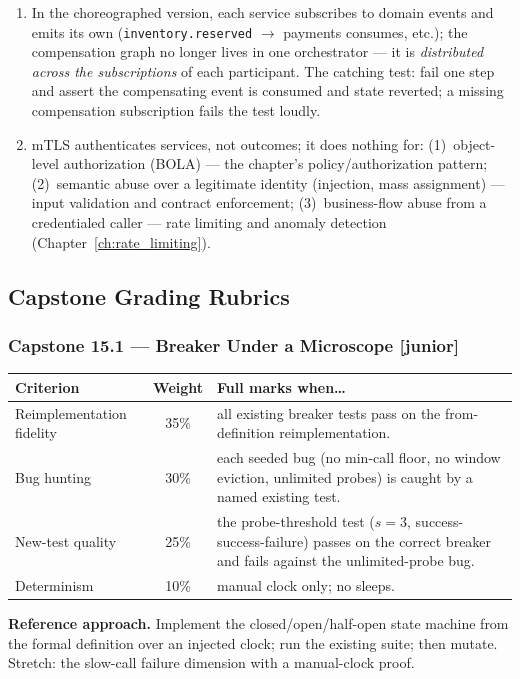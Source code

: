\begin{enumerate}[leftmargin=2.2em]
    tracks the last applied seq per aggregate and buffers/refetches on a
    gap. Crash-mid-batch replays then cannot interleave with new events ---
    the consumer enforces monotonic application per aggregate regardless of
    publisher timing.
  \item In the choreographed version, each service subscribes to domain
    events and emits its own (\texttt{inventory.reserved} $\to$ payments
    consumes, etc.); the compensation graph no longer lives in one
    orchestrator --- it is \emph{distributed across the subscriptions} of
    each participant. The catching test: fail one step and assert the
    compensating event is consumed and state reverted; a missing
    compensation subscription fails the test loudly.
  \item mTLS authenticates services, not outcomes; it does nothing for:
    (1)~object-level authorization (BOLA) --- the chapter's
    policy/authorization pattern; (2)~semantic abuse over a legitimate
    identity (injection, mass assignment) --- input validation and contract
    enforcement; (3)~business-flow abuse from a credentialed caller ---
    rate limiting and anomaly detection (Chapter~\ref{ch:rate_limiting}).
\end{enumerate}

\subsection{Capstone Grading Rubrics}

\subsubsection*{Capstone 15.1 --- Breaker Under a Microscope [junior]}
\begin{center}\small
\begin{tabularx}{\textwidth}{l c X}
\toprule
\textbf{Criterion} & \textbf{Weight} & \textbf{Full marks when\ldots} \\
\midrule
Reimplementation fidelity & 35\% & all existing breaker tests pass on the from-definition reimplementation. \\
Bug hunting & 30\% & each seeded bug (no min-call floor, no window eviction, unlimited probes) is caught by a named existing test. \\
New-test quality & 25\% & the probe-threshold test ($s{=}3$, success-success-failure) passes on the correct breaker and fails against the unlimited-probe bug. \\
Determinism & 10\% & manual clock only; no sleeps. \\
\bottomrule
\end{tabularx}
\end{center}
\textbf{Reference approach.} Implement the closed/open/half-open state
machine from the formal definition over an injected clock; run the existing
suite; then mutate. Stretch: the slow-call failure dimension with a
manual-clock proof.

